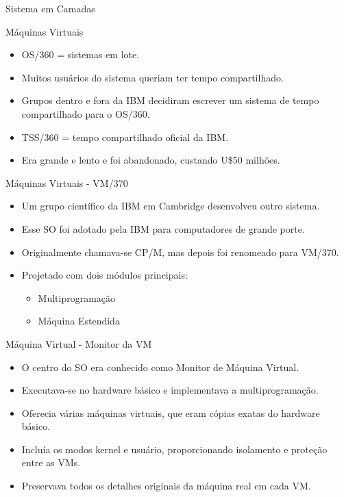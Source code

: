 \documentclass{beamer}
\begin{document}
\begin{frame}{Sistema em Camadas}
\begin{frame}{Máquinas Virtuais}
    \begin{itemize}
        \item OS/360 = sistemas em lote.
        \item Muitos usuários do sistema queriam ter tempo compartilhado.
        \item Grupos dentro e fora da IBM decidiram escrever um sistema de tempo compartilhado para o OS/360.
        \item TSS/360 = tempo compartilhado oficial da IBM.
        \item Era grande e lento e foi abandonado, custando U\$50 milhões.
    \end{itemize}
\end{frame}
\begin{frame}{Máquinas Virtuais - VM/370}
    \begin{itemize}
        \item Um grupo científico da IBM em Cambridge desenvolveu outro sistema.
        \item Esse SO foi adotado pela IBM para computadores de grande porte.
        \item Originalmente chamava-se CP/M, mas depois foi renomeado para VM/370.
        \item Projetado com dois módulos principais:
              \begin{itemize}
                  \item Multiprogramação
                  \item Máquina Estendida
              \end{itemize}
    \end{itemize}
\end{frame}
\begin{frame}{Máquina Virtual - Monitor da VM}
    \begin{itemize}
        \item O centro do SO era conhecido como Monitor de Máquina Virtual.
        \item Executava-se no hardware básico e implementava a multiprogramação.
        \item Oferecia várias máquinas virtuais, que eram cópias exatas do hardware básico.
        \item Incluía os modos kernel e usuário, proporcionando isolamento e proteção entre as VMs.
        \item Preservava todos os detalhes originais da máquina real em cada VM.
    \end{itemize}

\end{frame}
\end{frame}
\end{document}
